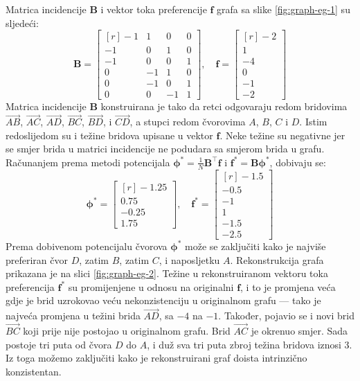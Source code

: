 \documentclass[lmodern, utf8, diplomski, numeric]{fer}
\newcommand{\matr}[1]{\mathbold{#1}}
\newcommand{\T}{\top}
\begin{document}
  Matrica incidencije $\matr{B}$ i vektor toka preferencije $\matr{f}$ grafa sa slike \ref{fig:graph-eg-1} su sljedeći:
  \begin{equation*}
  \matr{B} = \begin{bmatrix*}[r]
  -1 & 1 & 0 & 0 \\
  -1 & 0 & 1 & 0 \\
  -1 & 0 & 0 & 1 \\
  0 & -1 & 1 & 0 \\
  0 & -1 & 0 & 1 \\
  0 & 0 & -1 & 1
  \end{bmatrix*},\quad
  \matr{f} = \begin{bmatrix*}[r]
  -2 \\ 1 \\ -4 \\ 0 \\ -1 \\ -2
  \end{bmatrix*}
  \end{equation*}
  Matrica incidencije $\matr{B}$ konstruirana je tako da retci odgovaraju redom bridovima $\overrightarrow{AB}$, $\overrightarrow{AC}$, $\overrightarrow{AD}$, $\overrightarrow{BC}$, $\overrightarrow{BD}$, i $\overrightarrow{CD}$, a stupci redom čvorovima $A$, $B$, $C$ i $D$.
  Istim redoslijedom su i težine bridova upisane u vektor $\matr{f}$.
  Neke težine su negativne jer se smjer brida u matrici incidencije ne podudara sa smjerom brida u grafu.
  Računanjem prema metodi potencijala $\matr{\phi^*} = \frac{1}{N}\matr{B}^\T \matr{f}$ i $\matr{f^*} = \matr{B} \matr{\phi^*}$, dobivaju se:
  \begin{equation*}
  \matr{\phi}^* = \begin{bmatrix*}[r]
  -1.25 \\ 0.75 \\ -0.25 \\ 1.75
  \end{bmatrix*}, \quad
  \matr{f}^* = \begin{bmatrix*}[r]
  -1.5 \\ -0.5 \\ -1 \\ 1 \\ -1.5 \\ -2.5
  \end{bmatrix*}
  \end{equation*}
  Prema dobivenom potencijalu čvorova $\matr{\phi}^*$ može se zaključiti kako je najviše preferiran čvor $D$, zatim $B$, zatim $C$, i naposljetku $A$.
  Rekonstrukcija grafa prikazana je na slici \ref{fig:graph-eg-2}.
  Težine u rekonstruiranom vektoru toka preferencija $\matr{f}^*$ su promijenjene u odnosu na originalni $\matr{f}$, i to je promjena veća gdje je brid uzrokovao veću nekonzistenciju u originalnom grafu --- tako je najveća promjena u težini brida $\overrightarrow{AD}$, sa $-4$ na $-1$.
  Također, pojavio se i novi brid $\overrightarrow{BC}$ koji prije nije postojao u originalnom grafu.
  Brid $\overrightarrow{AC}$ je okrenuo smjer.
  Sada postoje tri puta od čvora $D$ do $A$, i duž sva tri puta zbroj težina bridova iznosi 3.
  Iz toga možemo zaključiti kako je rekonstruirani graf doista intrinzično konzistentan.
  
\end{document}
